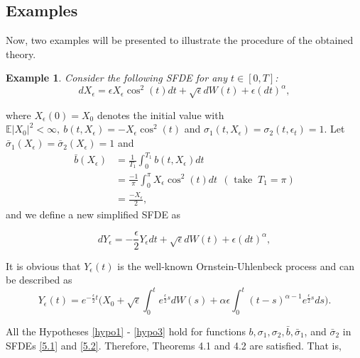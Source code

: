 \documentclass[a4 paper, 12pt]{report}
\theoremstyle{plain}
\newtheorem{example}[theorem]{\textbf{Example}}
\begin{document}
\subsection{Examples}
\noindent
\par Now, two examples will be presented to illustrate the procedure of the obtained
theory.\\
\begin{example}\label{e5.1}
\normalfont
 Consider the following SFDE for any $t\in[0,T]$:
\begin{equation}\label{5.1}
dX_\epsilon  = \epsilon X_\epsilon\cos^2(t)dt+\sqrt{\epsilon}dW(t)+\epsilon(dt)^{\alpha},
\end{equation}
\end{example}
where $X_\epsilon (0) = X_0$ denotes the initial value with $\mathbb{E}|X_0|^2<\infty,~b(t,X_\epsilon) = -X_\epsilon\cos^2(t)$ and $\sigma_1(t,X_\epsilon) = \sigma_2(t,\epsilon_t) = 1$. Let $\bar{\sigma}_1(X_\epsilon) = \bar{\sigma}_2(X_\epsilon) = 1$ and
\begin{align*}
 \bar{b}(X_\epsilon)& = \frac{1}{T_1}\int_0^{T_1}b(t,X_\epsilon)dt\\
& = \frac{-1}{\pi}\int_0^\pi X_\epsilon\cos^2(t)dt~~(\mbox{  take  }~ T_1 = \pi)\\
& = \frac{-X_\epsilon}{2},
\end{align*}
and we define a new simplified SFDE as

\begin{equation}\label{5.2}
dY_\epsilon = -\frac{\epsilon}{2}Y_\epsilon dt+\sqrt{\epsilon}dW(t)+\epsilon(dt)^{\alpha},
\end{equation}

It is obvious that $Y_\epsilon(t)$ is the well-known Ornstein-Uhlenbeck process and can
be described as
$$
Y_\epsilon(t) = e^{-\frac{\epsilon}{2}t}\bigg(X_0+\sqrt{\epsilon}\int_0^te^{\frac{\epsilon}{2}s}dW(s)+\alpha\epsilon\int_0^t(t-s)^{\alpha-1}e^{\frac{\epsilon}{2}s}ds\bigg).
$$

All the Hypotheses \ref{hypo1} - \ref{hypo3} hold for functions $b,\sigma_1,\sigma_2,\bar{b},\bar{\sigma}_1$, and $\bar{\sigma}_2$ in SFDEs \eqref{5.1}
and \eqref{5.2}. Therefore, Theorems 4.1 and 4.2 are satisfied. That is,
\end{document}
